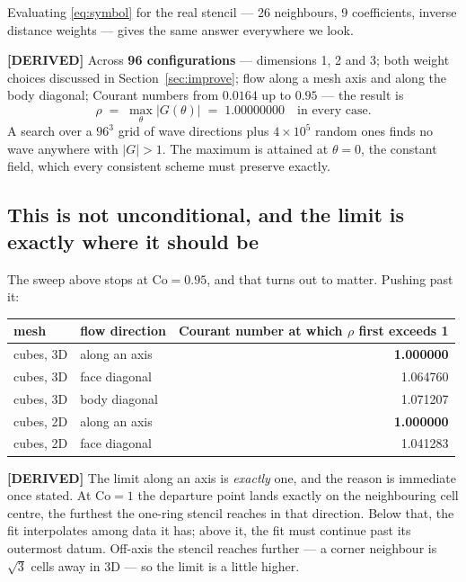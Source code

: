 \documentclass[11pt,a4paper]{article}
\newcommand{\derived}{\textcolor{blue!50!black}{\textbf{[DERIVED]}}}
\begin{document}
Evaluating \eqref{eq:symbol} for the real stencil --- 26 neighbours, 9 coefficients, inverse
distance weights --- gives the same answer everywhere we look.

\derived{} Across \textbf{96 configurations} --- dimensions 1, 2 and 3; both weight choices
discussed in Section~\ref{sec:improve}; flow along a mesh axis and along the body diagonal;
Courant numbers from $0.0164$ up to $0.95$ --- the result is
\begin{equation}
  \rho \;=\; \max_\theta |G(\theta)| \;=\; 1.00000000 \quad \text{in every case.}
\end{equation}
A search over a $96^3$ grid of wave directions plus $4\times10^5$ random ones finds no wave
anywhere with $|G| > 1$. The maximum is attained at $\theta = 0$, the constant field, which
every consistent scheme must preserve exactly.

\subsection{This is not unconditional, and the limit is exactly where it should be}
\label{sec:colimit}

The sweep above stops at $\mathrm{Co} = 0.95$, and that turns out to matter. Pushing past it:

\begin{center}
\begin{tabular}{llr}
\toprule
mesh & flow direction & Courant number at which $\rho$ first exceeds 1 \\
\midrule
cubes, 3D & along an axis   & \textbf{1.000000} \\
cubes, 3D & face diagonal   & 1.064760 \\
cubes, 3D & body diagonal   & 1.071207 \\
cubes, 2D & along an axis   & \textbf{1.000000} \\
cubes, 2D & face diagonal   & 1.041283 \\
\bottomrule
\end{tabular}
\end{center}

\derived{} The limit along an axis is \emph{exactly} one, and the reason is immediate once
stated. At $\mathrm{Co} = 1$ the departure point lands exactly on the neighbouring cell
centre, the furthest the one-ring stencil reaches in that direction. Below that, the fit
interpolates among data it has; above it, the fit must continue past its outermost datum.
Off-axis the stencil reaches further --- a corner neighbour is $\sqrt{3}$ cells away in 3D ---
so the limit is a little higher.
\end{document}
